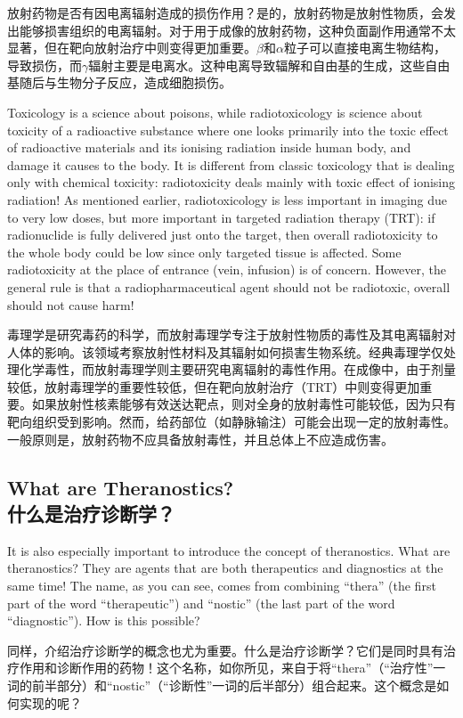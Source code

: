 \documentclass[dvipsnames, svgnames,a4paper,11pt]{article}
\begin{document}
放射药物是否有因电离辐射造成的损伤作用？是的，放射药物是放射性物质，会发出能够损害组织的电离辐射。对于用于成像的放射药物，这种负面副作用通常不太显著，但在靶向放射治疗中则变得更加重要。$\beta$和$\alpha$粒子可以直接电离生物结构，导致损伤，而$\gamma$辐射主要是电离水。这种电离导致辐解和自由基的生成，这些自由基随后与生物分子反应，造成细胞损伤。

Toxicology is a science about poisons, while radiotoxicology is science about toxicity
of a radioactive substance where one looks primarily into the toxic effect of
radioactive materials and its ionising radiation inside human body, and damage it
causes to the body. It is different from classic toxicology that is dealing only with
chemical toxicity: radiotoxicity deals mainly with toxic effect of ionising radiation! As
mentioned earlier, radiotoxicology is less important in imaging due to very low doses,
but more important in targeted radiation therapy (TRT): if radionuclide is fully
delivered just onto the target, then overall radiotoxicity to the whole body could be
low since only targeted tissue is affected. Some radiotoxicity at the place of entrance
(vein, infusion) is of concern. However, the general rule is that a radiopharmaceutical
agent should not be radiotoxic, overall should not cause harm!

毒理学是研究毒药的科学，而放射毒理学专注于放射性物质的毒性及其电离辐射对人体的影响。该领域考察放射性材料及其辐射如何损害生物系统。经典毒理学仅处理化学毒性，而放射毒理学则主要研究电离辐射的毒性作用。在成像中，由于剂量较低，放射毒理学的重要性较低，但在靶向放射治疗（TRT）中则变得更加重要。如果放射性核素能够有效送达靶点，则对全身的放射毒性可能较低，因为只有靶向组织受到影响。然而，给药部位（如静脉输注）可能会出现一定的放射毒性。一般原则是，放射药物不应具备放射毒性，并且总体上不应造成伤害。

\subsection{What are Theranostics?\\什么是治疗诊断学？}

It is also especially important to introduce the concept of theranostics. What are theranostics? They are agents that are both therapeutics and diagnostics at the same time! The name, as you can see, comes from combining “thera” (the first part of the word “therapeutic”) and “nostic” (the last part of the word “diagnostic”). How is this possible?

同样，介绍治疗诊断学的概念也尤为重要。什么是治疗诊断学？它们是同时具有治疗作用和诊断作用的药物！这个名称，如你所见，来自于将“thera”（“治疗性”一词的前半部分）和“nostic”（“诊断性”一词的后半部分）组合起来。这个概念是如何实现的呢？
\end{document}
